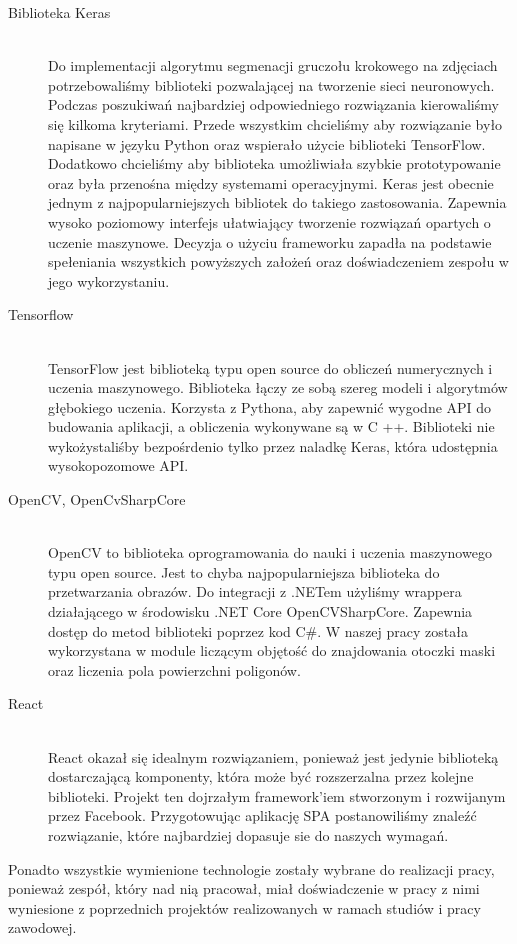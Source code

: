 \documentclass[a4paper,11pt,twoside]{report}
\theoremstyle{definition}
\begin{document}
\begin{description}
\item [Biblioteka Keras] \hfill \\
Do implementacji algorytmu segmenacji gruczołu krokowego na zdjęciach potrzebowaliśmy biblioteki pozwalającej na tworzenie sieci neuronowych. Podczas poszukiwań najbardziej odpowiedniego rozwiązania kierowaliśmy się kilkoma kryteriami. Przede wszystkim chcieliśmy aby rozwiązanie było napisane w języku Python oraz wspierało użycie biblioteki TensorFlow. Dodatkowo chcieliśmy aby biblioteka umożliwiała szybkie prototypowanie oraz była przenośna między systemami operacyjnymi. Keras jest obecnie jednym z najpopularniejszych bibliotek do takiego zastosowania. Zapewnia wysoko poziomowy interfejs ułatwiający tworzenie rozwiązań opartych o uczenie maszynowe. Decyzja o użyciu frameworku zapadła na podstawie spełeniania wszystkich powyższych założeń oraz doświadczeniem zespołu w jego wykorzystaniu.
\item[Tensorflow] \hfill \\
TensorFlow jest biblioteką typu open source do obliczeń numerycznych i uczenia maszynowego. Biblioteka łączy ze sobą szereg modeli i algorytmów głębokiego uczenia. Korzysta z Pythona, aby zapewnić wygodne API do budowania aplikacji, a obliczenia wykonywane są w C ++. Biblioteki nie wykożystaliśby bezpośrdenio tylko przez naladkę Keras, która udostępnia wysokopozomowe API.
\item [OpenCV, OpenCvSharpCore] \hfill \\
OpenCV \cite{OpenCV} to biblioteka oprogramowania do nauki i uczenia maszynowego typu open source. Jest to chyba najpopularniejsza biblioteka do przetwarzania obrazów. Do integracji z .NETem użyliśmy wrappera działającego w środowisku .NET Core OpenCVSharpCore. Zapewnia dostęp do metod biblioteki poprzez kod C\#. W naszej pracy została wykorzystana w module liczącym objętość do znajdowania otoczki maski oraz liczenia pola powierzchni poligonów.
\item [React] \hfill \\
  React okazał się idealnym rozwiązaniem, ponieważ jest jedynie biblioteką dostarczającą komponenty, która może być rozszerzalna przez kolejne biblioteki. Projekt ten dojrzałym framework'iem stworzonym i rozwijanym przez Facebook. Przygotowując aplikację SPA postanowiliśmy znaleźć rozwiązanie, które najbardziej dopasuje sie do naszych wymagań. 
\end{description}

Ponadto wszystkie wymienione technologie zostały wybrane do realizacji pracy, ponieważ zespół, który nad nią pracował, miał doświadczenie w pracy z nimi wyniesione z poprzednich projektów realizowanych w ramach studiów i pracy zawodowej.
\end{document}
